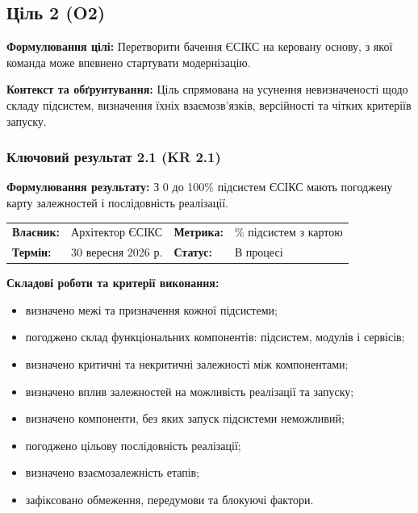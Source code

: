 \documentclass{article}
\begin{document}
\newpage

\subsection{Ціль 2 (O2)}

\textbf{Формулювання цілі:} Перетворити бачення ЄСІКС на керовану основу, з якої команда може впевнено стартувати модернізацію.

\textbf{Контекст та обґрунтування:}
Ціль спрямована на усунення невизначеності щодо складу підсистем, визначення їхніх взаємозв’язків, версійності та чітких критеріїв запуску.

\subsubsection{Ключовий результат 2.1 (KR 2.1)}

\textbf{Формулювання результату:} З 0 до 100\% підсистем ЄСІКС мають погоджену карту залежностей і послідовність реалізації.

\noindent\begin{tabular}{@{}p{2.2cm}p{4.5cm}p{2.2cm}p{4.5cm}@{}}
\toprule
\textbf{Власник:} & Архітектор ЄСІКС & \textbf{Метрика:} & \% підсистем з картою \\
\textbf{Термін:} & 30 вересня 2026 р. & \textbf{Статус:} & В процесі \\
\bottomrule
\end{tabular}

\vspace{10pt}
\textbf{Складові роботи та критерії виконання:}
\begin{itemize}
    \item визначено межі та призначення кожної підсистеми;
    \item погоджено склад функціональних компонентів: підсистем, модулів і сервісів;
    \item визначено критичні та некритичні залежності між компонентами;
    \item визначено вплив залежностей на можливість реалізації та запуску;
    \item визначено компоненти, без яких запуск підсистеми неможливий;
    \item погоджено цільову послідовність реалізації;
    \item визначено взаємозалежність етапів;
    \item зафіксовано обмеження, передумови та блокуючі фактори.
\end{itemize}
\end{document}
